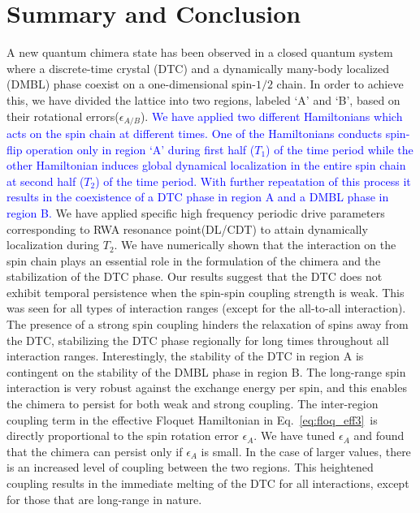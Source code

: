 \documentclass[12pt]{iopart}
\newcommand{\red}[1]{\textcolor{red}{#1}}
\newcommand{\blue}[1]{\textcolor{blue}{#1}}
\begin{document}
\section{\label{sec:level7} Summary and Conclusion}
A new quantum chimera state has been observed in a closed quantum system where a discrete-time crystal (DTC) and a dynamically many-body localized (DMBL) phase coexist on a one-dimensional spin-$1/2$ chain. In order to achieve this, we have divided the lattice into two regions, labeled `A' and `B', based on their rotational errors($\epsilon_{A/B}$). \blue{We have applied two different Hamiltonians which acts on the spin chain at different times. One of the Hamiltonians conducts spin-flip operation only in region `A' during first half ($T_1$) of the time period while the other Hamiltonian induces global dynamical localization in the entire spin chain at second half ($T_2$) of the time period. With further repeatation of this process it results in the coexistence of a DTC phase in region A and a DMBL phase in region B.} We have applied specific high frequency periodic drive parameters corresponding to RWA resonance point(DL/CDT) to attain dynamically localization during $T_2$. We have numerically shown that the interaction on the spin chain plays an essential role in the formulation of the chimera and the stabilization of the DTC phase. Our results suggest that the DTC does not exhibit temporal persistence when the spin-spin coupling strength is weak. This was seen for all types of interaction ranges (except for the all-to-all interaction). The presence of a strong spin coupling hinders the relaxation of spins away from the DTC, stabilizing the DTC phase regionally for long times throughout all interaction ranges. Interestingly, the stability of the DTC in region A is contingent on the stability of the DMBL phase in region B. The long-range spin interaction is very robust against the exchange energy per spin, and this enables the chimera to persist for both weak and strong coupling. %
The inter-region coupling term in the effective Floquet Hamiltonian in Eq.~\ref{eq:floq_eff3} is directly proportional to the spin rotation error $\epsilon_A$. We have tuned $\epsilon_A$ and found that the chimera can persist only if $\epsilon_A$ is small. In the case of larger values, there is an increased level of coupling between the two regions. This heightened coupling results in the immediate melting of the DTC for all interactions, except for those that are long-range in nature.
	
\end{document}

